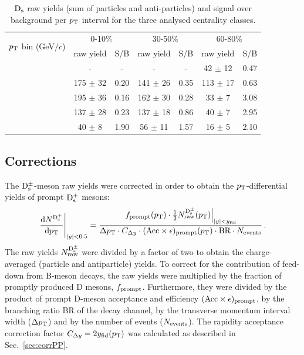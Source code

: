  \begin{table}[!h]
 \begin{center}
  \begin{tabular}{|c|c|c|c|c|c|c|}
\hline
\multirow{2}{*}{$p_{\rm T}$ bin (GeV$/c$)}& \multicolumn{2}{c|}{0-10$\%$} & \multicolumn{2}{c|}{30-50$\%$} & \multicolumn{2}{c|}{60-80$\%$} \\
\cline{2-7}
& raw yield & S/B & raw yield & S/B & raw yield & S/B \\
\hline
\hline
[2,4] & -  & - & -  & - & 42 $\pm$ 12 & 0.47 \\
\hline
[4,6] &  175 $\pm$ 32  & 0.20 & 141 $\pm$ 26  & 0.35 & 113 $\pm$ 17 & 0.63\\
\hline
[6,8] &  195 $\pm$ 36  & 0.16 & 162 $\pm$ 30 & 0.28 & 33 $\pm$ 7 & 3.08 \\
\hline
[8,12] & 137 $\pm$ 28 & 0.23 & 137 $\pm$ 18 & 0.86 & 40 $\pm$ 7 & 2.95 \\
\hline
[12,16] & 40 $\pm$ 8  & 1.90 & 56 $\pm$ 11 & 1.57 & 16 $\pm$ 5 & 2.10 \\
\hline
  \end{tabular}
 \caption{${\rm D_s}$ raw yields (sum of particles and anti-particles) and signal over background per $p_{\rm T}$ interval for the three analysed centrality classes.}
  \label{tab:signalDs_010_3050_6080}
\end{center}
\end{table} 

\subsection{Corrections}
\label{sec:CorrectionsAA}
The ${\rm D_s^{\pm}}$-meson raw yields were corrected in order to obtain the
$p_{\rm T}$-differential yields of prompt ${\rm D_s^+}$ mesons: 
\begin{equation}
  \label{eq:dNdpt}
  \left.\frac{{\rm d} N^{{\rm D_s^+}}}{{\rm d}p_{\rm T}}\right|_{|y|<0.5}=
  \frac{\left.f_{\rm prompt}(p_{\rm T})\cdot \frac{1}{2} N_{\rm raw}^{\rm
        {\rm D_s^{\pm}}}(p_{\rm T})\right|_{|y|<y_{\rm fid}}}{\Delta p_{\rm T} \cdot
   C_{\Delta y} \cdot ({\rm Acc}\times\epsilon)_{\rm prompt}(p_{\rm T})
    \cdot{\rm BR} \cdot N_{\rm events}}\,.
\end{equation}
The raw yields $N_{\rm raw}^{\rm {\rm D_s^{\pm}}}$ were divided by 
a factor of two to obtain the charge-averaged (particle and antiparticle) 
yields. To correct for the contribution of feed-down from B-meson decays,
 the raw yields were multiplied by the fraction of promptly produced D 
 mesons, $f_{\rm prompt}$. Furthermore, they were divided by the product 
 of prompt D-meson acceptance and efficiency 
 $({\rm Acc}\times\epsilon)_{\rm prompt}$, by the branching ratio {\rm BR} 
 of the decay channel, by the transverse momentum interval width 
 ($\Delta p_{\rm T}$) and by the number of events ($N_{\rm events}$). The rapidity acceptance 
 correction factor $C_{\Delta y}= 2 y_{\rm fid}(p_{\rm T})$ was calculated as described in Sec.~\ref{sec:corrPP}.

